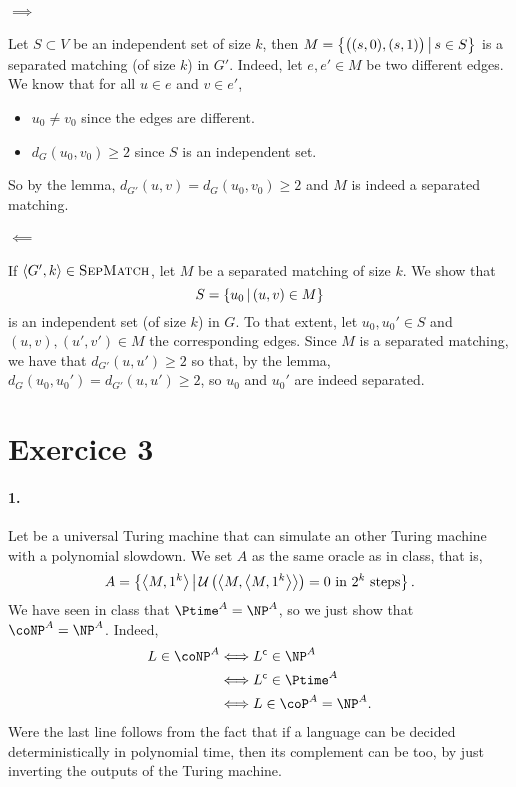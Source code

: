     \paragraph{$\implies$}
    Let $S \subset V$ be an independent set of size $k$,
    then $M = \left\{ 
        \big(
            (s, 0), (s, 1)
        \big) \, \middle| \, 
            s \in S
         \right\}
    $ is a separated matching (of size $k$) in $G'$.
    Indeed, let $e, e' \in M$ be two different edges.
    We know that for all $u \in e$ and $v \in e'$, 
    \begin{itemize}
        \item $u_0 \neq v_0$ since the edges are different.
        \item $d_G(u_0, v_0) \geq 2$ since $S$ is an independent set.
    \end{itemize}
    So by the lemma, $d_{G'}(u, v) = d_G(u_0, v_0) \geq 2$
    and $M$ is indeed a separated matching.

    \paragraph{$\impliedby$}
    If $\left\langle G', k \right\rangle \in \textsc{SepMatch}$, 
    let $M$ be a separated matching of size $k$. 
    We show that 
    \[
        S = \left\{ u_0 \, \middle| \, (u, v) \in M \right\}
    \]  
    is an independent set (of size $k$) in $G$.
    To that extent, let $u_0, u_0' \in S$
    and $(u, v), (u', v') \in M$ the corresponding edges.
    Since $M$ is a separated matching, 
    we have that $d_{G'}(u, u') \geq 2$
    so that, by the lemma, $d_G(u_0, u_0') = d_{G'}(u, u') \geq 2$,
    so $u_0$ and $u_0'$ are indeed separated.


    \section*{Exercice 3}

    \paragraph{1.}
    Let \Uu be a universal Turing machine that can
    simulate an other Turing machine with a polynomial slowdown.
    We set $A$ as the same oracle as in class, that is, 
    \[
        A = \left\{  \left\langle M, 1^k \right\rangle  \, \middle| \, 
            \mathcal U\left(
                \left\langle M, \left\langle M, 1^k \right\rangle \right\rangle
            \right) = 0
            \text{ in } 2^k \text{ steps}
         \right\}.
    \]
    We have seen in class that $\Ptime^A = \NP^A$, so we just show that
    $\coNP^A = \NP^A$. Indeed, 
    \begin{align*}
        L \in \coNP^A 
        &\iff 
        \compl{L} \in \NP^A
        \\& \iff 
        \compl{L} \in \Ptime^A
        \\& \iff 
        L \in \coP^A = \NP^A.
    \end{align*}
    Were the last line follows from the fact that if a language can be 
    decided deterministically in polynomial time, then its complement
    can be too, by just inverting the outputs of the Turing machine.

